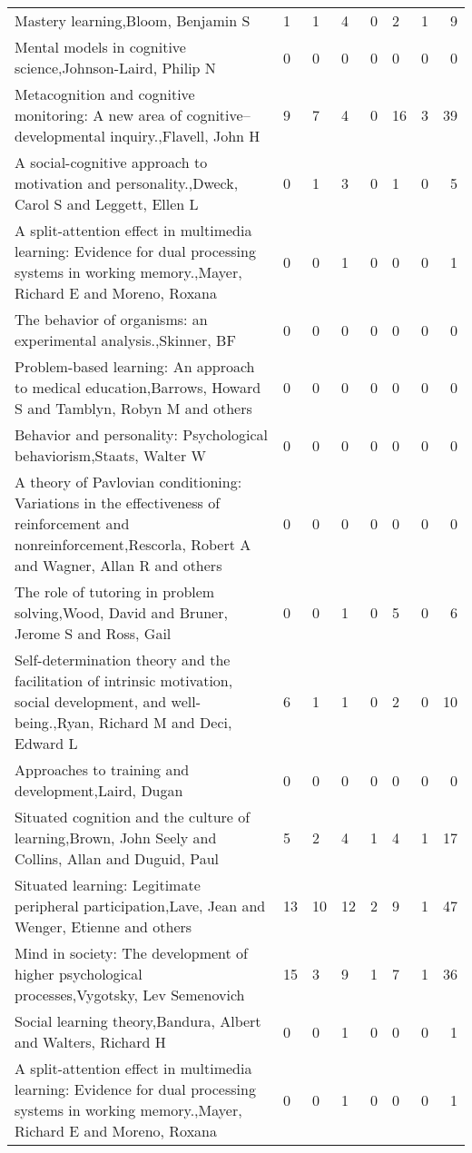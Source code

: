 \begin{table*}[t]
\begin{tabular}{lp{2cm}p{2cm}p{2cm}p{2cm}p{2cm}p{2cm}r}
Mastery learning,Bloom, Benjamin S & 1 & 1 & 4 & 0 & 2 & 1 & 9\\
Mental models in cognitive science,Johnson-Laird, Philip N & 0 & 0 & 0 & 0 & 0 & 0 & 0\\
Metacognition and cognitive monitoring: A new area of cognitive--developmental inquiry.,Flavell, John H & 9 & 7 & 4 & 0 & 16 & 3 & 39\\
A social-cognitive approach to motivation and personality.,Dweck, Carol S and Leggett, Ellen L & 0 & 1 & 3 & 0 & 1 & 0 & 5\\
A split-attention effect in multimedia learning: Evidence for dual processing systems in working memory.,Mayer, Richard E and Moreno, Roxana & 0 & 0 & 1 & 0 & 0 & 0 & 1\\
The behavior of organisms: an experimental analysis.,Skinner, BF & 0 & 0 & 0 & 0 & 0 & 0 & 0\\
Problem-based learning: An approach to medical education,Barrows, Howard S and Tamblyn, Robyn M and others & 0 & 0 & 0 & 0 & 0 & 0 & 0\\
Behavior and personality: Psychological behaviorism,Staats, Walter W & 0 & 0 & 0 & 0 & 0 & 0 & 0\\
A theory of Pavlovian conditioning: Variations in the effectiveness of reinforcement and nonreinforcement,Rescorla, Robert A and Wagner, Allan R and others & 0 & 0 & 0 & 0 & 0 & 0 & 0\\
The role of tutoring in problem solving,Wood, David and Bruner, Jerome S and Ross, Gail & 0 & 0 & 1 & 0 & 5 & 0 & 6\\
Self-determination theory and the facilitation of intrinsic motivation, social development, and well-being.,Ryan, Richard M and Deci, Edward L & 6 & 1 & 1 & 0 & 2 & 0 & 10\\
Approaches to training and development,Laird, Dugan & 0 & 0 & 0 & 0 & 0 & 0 & 0\\
Situated cognition and the culture of learning,Brown, John Seely and Collins, Allan and Duguid, Paul & 5 & 2 & 4 & 1 & 4 & 1 & 17\\
Situated learning: Legitimate peripheral participation,Lave, Jean and Wenger, Etienne and others & 13 & 10 & 12 & 2 & 9 & 1 & 47\\
Mind in society: The development of higher psychological processes,Vygotsky, Lev Semenovich & 15 & 3 & 9 & 1 & 7 & 1 & 36\\
Social learning theory,Bandura, Albert and Walters, Richard H & 0 & 0 & 1 & 0 & 0 & 0 & 1\\
A split-attention effect in multimedia learning: Evidence for dual processing systems in working memory.,Mayer, Richard E and Moreno, Roxana & 0 & 0 & 1 & 0 & 0 & 0 & 1\\

\end{tabular}
\end{table*}
